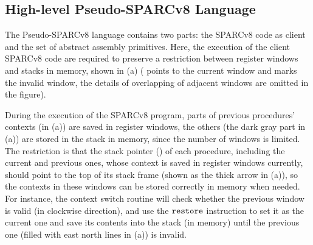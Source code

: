 \subsection{High-level Pseudo-SPARCv8 Language}
\label{subsec:High-level Pseudo-SPARCv8 Language}

The Pseudo-SPARCv8 language contains two parts:
the SPARCv8 code as client
and the set of abstract assembly primitives.
Here, the execution of the client SPARCv8 code
are required to preserve a restriction between register
windows and stacks in memory, shown
in 
\Fig{\ref{fig:Abstraction of Register Windows and Memory}} (a)
(\regcwp{} points to the current window and \regwim{} marks
the invalid window, the details of overlapping
of adjacent windows are omitted in the figure).
\begin{center}
    
    \vspace*{-0.5em}
    \label{fig:Abstraction of Register Windows and Memory}
    \vspace{-0.5em}
\end{center}
During the execution of the SPARCv8 program,
parts of previous procedures' contexts
(in \Fig{\ref{fig:Abstraction of Register Windows and Memory}} (a))
are saved in register windows, the others
(the dark gray part in
\Fig{\ref{fig:Abstraction of Register Windows and Memory}} (a))
are stored in the stack in memory,
since the number of windows is limited.
The restriction is that the stack pointer
(\spreg{}) of each procedure,
including the current and previous ones,
whose context is saved in register windows currently, 
should point to the top of its stack frame
(shown as the thick arrow in
\Fig{\ref{fig:Abstraction of Register Windows and Memory}} (a)),
so the contexts
in these windows can be stored correctly
in memory when needed. For instance,
the context switch routine will check
whether the previous window is valid
(in clockwise direction),
and use the $\texttt{restore}{}$ instruction to set it as the
current one and save its contents into the stack
(in memory) until the previous one
(filled with east north lines
in \Fig{\ref{fig:Abstraction of Register Windows and Memory}} (a)) is invalid.
